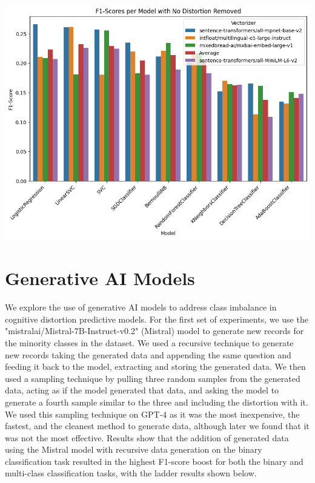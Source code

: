 \documentclass[a0,landscape]{a0poster}
\begin{document}
\begin{multicols}{4}
\begin{center}\vspace{1cm}
\includegraphics[width=0.81\linewidth]{figures/F1ScoresInitSBERT.png}
\end{center}

\color{Black}

\color{Teal}
\section*{Generative AI Models}
\color{Black}

We explore the use of generative AI models to address class imbalance in cognitive distortion predictive models. 
For the first set of experiments, we use the "mistralai/Mistral-7B-Instruct-v0.2" (Mistral) model to generate new records for the minority classes in the dataset.
We used a recursive technique to generate new records taking the generated data and appending the same question and feeding it back to the model, extracting and storing 
the generated data.
We then used a sampling technique by pulling three random samples from the generated data, acting as if the model generated that data, and asking the model to generate 
a fourth sample similar to the three and including the distortion with it.
We used this sampling technique on GPT-4 as it was the most inexpensive, the fastest, and the cleanest method to generate data, although later we found that it was not 
the most effective.
Results show that the addition of generated data using the Mistral model with recursive data generation on the binary classification task resulted in
the highest F1-score boost for both the binary and multi-class classification tasks, with the ladder results shown below.


\end{multicols}
\end{document}
